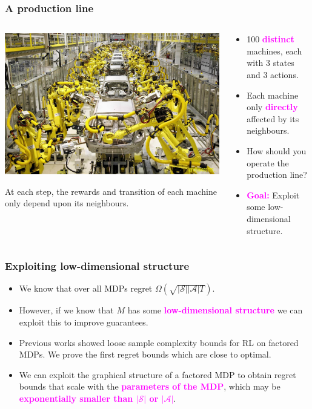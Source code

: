 \documentclass{beamer}
\newlength{\wideitemsep}
\let\olditem\item
\renewcommand{\item}{\setlength{\itemsep}{\wideitemsep}\olditem}
\newcommand{\Sc}{\mathcal{S}}
\newcommand{\Ac}{\mathcal{A}}
\newcommand{\bspace}{\vspace{3mm}}
\newcommand{\hilite}[1]{\textcolor{magenta}{\textbf{#1}}}
\begin{document}
\begin{frame}
\frametitle{A production line}
  \begin{columns}[T]
    \begin{column}{.5\textwidth}
        \includegraphics[width=\textwidth]{./media/productionLine}

        At each step, the rewards and transition of each machine only depend upon its neighbours.
    \end{column}

    \begin{column}{.5\textwidth}
    \begin{itemize}
        \item 100 \hilite{distinct} machines, each with 3 states and 3 actions.
        \bspace
        \item Each machine only \hilite{directly} affected by its neighbours.
        \bspace
        \item How should you operate the production line?
        \bspace
        \pause
        \item \hilite{Goal:} Exploit some low-dimensional structure.
    \end{itemize}
    \end{column}
  \end{columns}
\end{frame}

\begin{frame}
\frametitle{Exploiting low-dimensional structure}
\begin{itemize}
    \item We know that over all MDPs regret $\Omega(\sqrt{|\Sc||\Ac|T})$.
    \bspace
    \item However, if we know that $M$ has some \hilite{low-dimensional structure} we can exploit this to improve guarantees.
    \bspace
    \item Previous works \cite{kearns1999efficient} showed loose sample complexity bounds for RL on factored MDPs. We prove the first regret bounds which are close to optimal.
    \bspace
    \item We can exploit the graphical structure of a factored MDP to obtain regret bounds that scale with the \hilite{parameters of the MDP}, which may be \hilite{exponentially smaller than $|\Sc|$ or $|\Ac|$}.
\end{itemize}
\end{frame}
\end{document}
